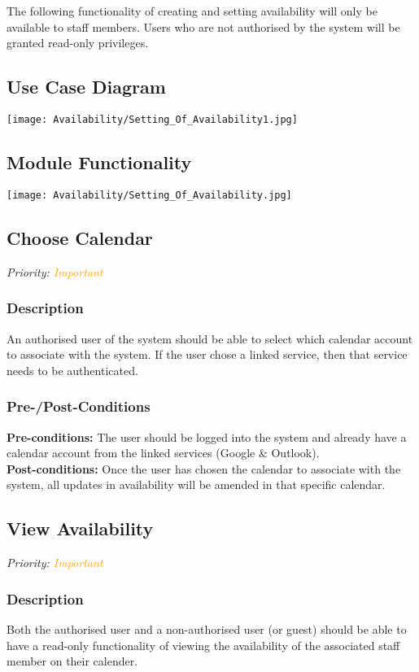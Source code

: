 The following functionality of creating and setting availability will only be available to staff members. Users who are not authorised by the system will be granted read-only privileges.
\subsection{Use Case Diagram}
\texttt{[image: Availability/Setting\_Of\_Availability1.jpg]}

\subsection{Module Functionality}
\texttt{[image: Availability/Setting\_Of\_Availability.jpg]}


\subsection{Choose Calendar}
\textit{Priority: \textcolor{orange}{Important}}
	\subsubsection{Description}
	An authorised user of the system should be able to select which calendar account to associate with the system. If the user chose a linked service, then that service needs to be authenticated.\\
	\subsubsection{Pre-/Post-Conditions}
		\textbf{Pre-conditions:} The user should be logged into the system and already have a calendar account from the linked services (Google \& Outlook). \\
		\textbf{Post-conditions:} Once the user has chosen the calendar to associate with the system, all updates in availability will be amended in that specific calendar.

\subsection{View Availability}
\textit{Priority: \textcolor{orange}{Important}}
	\subsubsection{Description}
	Both the authorised user and a non-authorised user (or guest) should be able to have a read-only functionality of viewing the availability of the associated staff member on their calender.\\

